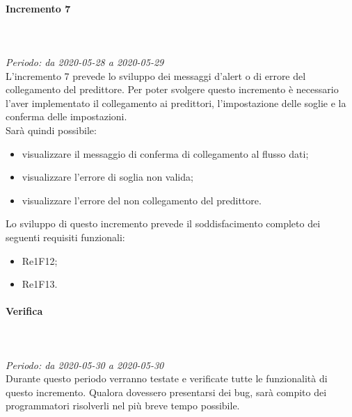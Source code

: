 \paragraph{Incremento 7}\mbox{} \\ \mbox{} \\ 
\textit{Periodo: da 2020-05-28 a 2020-05-29}\\
L’incremento 7 prevede lo sviluppo dei messaggi d'alert o di errore del collegamento del predittore. Per poter svolgere questo incremento è necessario l'aver implementato il collegamento ai predittori, l'impostazione delle soglie e la conferma delle impostazioni. \\
Sarà quindi possibile:
\begin{itemize}
	\item visualizzare il messaggio di conferma di collegamento al flusso dati;
	\item visualizzare l'errore di soglia non valida;
	\item visualizzare l'errore del non collegamento del predittore.
\end{itemize}
Lo sviluppo di questo incremento prevede il soddisfacimento completo dei seguenti requisiti funzionali:
\begin{itemize}
\item Re1F12;
\item Re1F13.
\end{itemize}
\paragraph*{Verifica}\mbox{} \\ \mbox{} \\ 
\textit{Periodo: da 2020-05-30 a 2020-05-30}\\
Durante questo periodo verranno testate e verificate tutte le funzionalità di questo incremento. Qualora dovessero presentarsi dei bug, sarà compito dei programmatori risolverli nel più breve tempo possibile.

